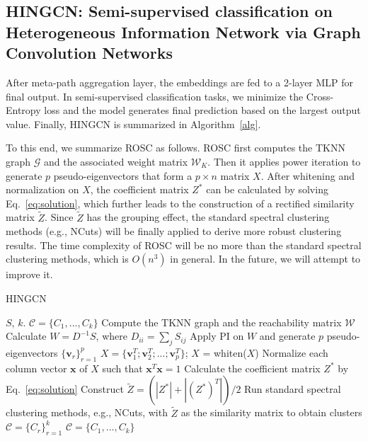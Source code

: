 \subsection{HINGCN: Semi-supervised classification on Heterogeneous Information Network via Graph Convolution Networks}
After meta-path aggregation layer, the embeddings are fed to a 2-layer MLP for final output. In semi-supervised classification tasks, we minimize the Cross-Entropy loss and the model generates final prediction based on the largest output value.
Finally, HINGCN is summarized in Algorithm~\ref{alg}.

To this end, we summarize ROSC as follows.
ROSC first computes the TKNN graph $\mathcal{G}$
and the associated weight matrix $\mathcal{W}_K$. Then it applies power iteration to generate $p$
pseudo-eigenvectors that form a $p \times n$ matrix $X$.
After whitening and normalization on $X$,
the coefficient matrix $Z^*$ can be calculated by solving Eq.~\ref{eq:solution},
which further leads to the construction of a rectified similarity matrix $\tilde{Z}$.
Since $\tilde{Z}$ has the grouping effect, 
the standard spectral clustering methods (e.g., NCuts) will be finally applied to derive more robust clustering results.
The time complexity of ROSC will be no more than the standard spectral clustering methods,
which is $O(n^3)$ in general.
In the future, we will attempt to improve it. 


\begin{algorithm}
\begin{small}
\caption{HINGCN}
\label{alg}
\begin{algorithmic}[1]
\Require $S$, $k$.
\Ensure $\mathcal{C} = \{C_1, ..., C_k\}$
\State Compute the TKNN graph and the reachability matrix $\mathcal{W}$
\State Calculate $W = D^{-1}S$, where $D_{ii} = \sum_jS_{ij}$
\State Apply PI on $W$ and generate $p$ pseudo-eigenvectors $\{\bm{v}_r\}_{r=1}^p$
\State $X = \{\bm{v}_1^T; \bm{v}_2^T; ...; \bm{v}_p^T\}$; $X$ = whiten($X$)
\State Normalize each column vector $\bm{x}$ of $X$ such that $\bm{x}^T\bm{x} = 1$
\State Calculate the coefficient matrix $Z^*$ by Eq.~\ref{eq:solution}
\State Construct $\tilde{Z} = (|Z^*| + |(Z^*)^T|)/2$
\State Run standard spectral clustering methods, e.g., NCuts, with $\tilde{Z}$ as the
similarity matrix to obtain clusters $\mathcal{C} = \{C_r\}_{r=1}^k$
\State \Return $\mathcal{C} = \{C_1, ..., C_k\}$
\end{algorithmic}
\end{small}
\end{algorithm}









